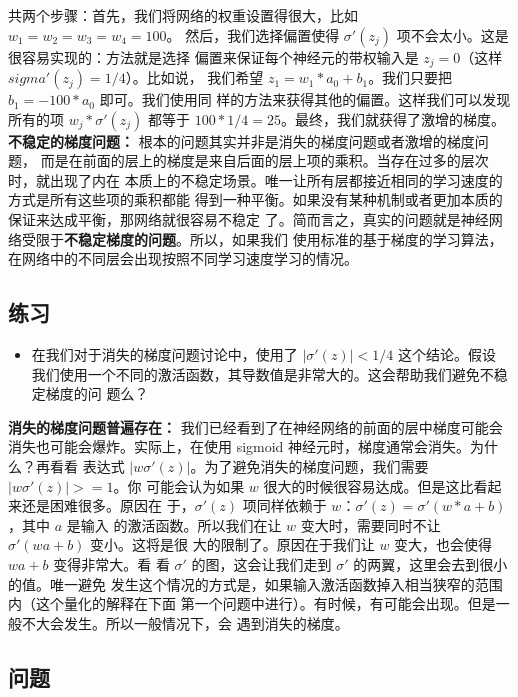 共两个步骤：首先，我们将网络的权重设置得很大，比如 $w_1 = w_2 = w_3 = w_4 = 100$。
然后，我们选择偏置使得 $\sigma'(z_j)$ 项不会太小。这是很容易实现的：方法就是选择
偏置来保证每个神经元的带权输入是 $z_j = 0$（这样 $sigma'(z_j) = 1/4$）。比如说，
我们希望 $z_1 = w_1 * a_0 + b_1$。我们只要把 $b_1 = -100 * a_0$ 即可。我们使用同
样的方法来获得其他的偏置。这样我们可以发现所有的项 $w_j * \sigma'(z_j)$ 都等于
$100*1/4 = 25$。最终，我们就获得了激增的梯度。\\
 
\textbf{不稳定的梯度问题：} 根本的问题其实并非是消失的梯度问题或者激增的梯度问题，
而是在前面的层上的梯度是来自后面的层上项的乘积。当存在过多的层次时，就出现了内在
本质上的不稳定场景。唯一让所有层都接近相同的学习速度的方式是所有这些项的乘积都能
得到一种平衡。如果没有某种机制或者更加本质的保证来达成平衡，那网络就很容易不稳定
了。简而言之，真实的问题就是神经网络受限于\textbf{不稳定梯度的问题}。所以，如果我们
使用标准的基于梯度的学习算法，在网络中的不同层会出现按照不同学习速度学习的情况。

\subsection*{练习}

\begin{itemize}
\item 在我们对于消失的梯度问题讨论中，使用了 $|\sigma'(z)| < 1/4$ 这个结论。假设
  我们使用一个不同的激活函数，其导数值是非常大的。这会帮助我们避免不稳定梯度的问
  题么？
\end{itemize}
 
\textbf{消失的梯度问题普遍存在：} 我们已经看到了在神经网络的前面的层中梯度可能会
消失也可能会爆炸。实际上，在使用 sigmoid 神经元时，梯度通常会消失。为什么？再看看
表达式 $|w\sigma'(z)|$。为了避免消失的梯度问题，我们需要 $|w\sigma'(z)| >= 1$。你
可能会认为如果 $w$ 很大的时候很容易达成。但是这比看起来还是困难很多。原因在
于，$\sigma'(z)$ 项同样依赖于 $w$：$\sigma'(z) = \sigma'(w*a+b)$，其中 $a$ 是输入
的激活函数。所以我们在让 $w$ 变大时，需要同时不让 $\sigma'(wa+b)$ 变小。这将是很
大的限制了。原因在于我们让 $w$ 变大，也会使得 $wa + b$ 变得非常大。看
看 $\sigma'$ 的图，这会让我们走到 $\sigma'$ 的两翼，这里会去到很小的值。唯一避免
发生这个情况的方式是，如果输入激活函数掉入相当狭窄的范围内（这个量化的解释在下面
第一个问题中进行）。有时候，有可能会出现。但是一般不大会发生。所以一般情况下，会
遇到消失的梯度。

\subsection*{问题}

